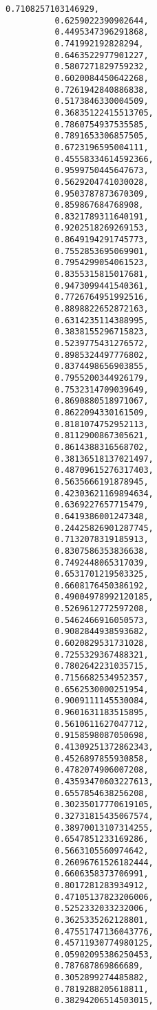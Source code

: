 \documentclass[11pt]{article}
\begin{document}
\begin{Verbatim}[commandchars=\\\{\}]
          0.7108257103146929,
          0.6259022390902644,
          0.4495347396291868,
          0.741992192828294,
          0.6463522977901227,
          0.5807271829759232,
          0.6020084450642268,
          0.7261942840886838,
          0.5173846330004509,
          0.36835122415513705,
          0.7860754937535585,
          0.7891653306857505,
          0.6723196595004111,
          0.45558334614592366,
          0.9599750445647673,
          0.5629204741030028,
          0.9503787873670309,
          0.859867684768908,
          0.8321789311640191,
          0.9202518269269153,
          0.8649194291745773,
          0.7552853695069901,
          0.7954299054061523,
          0.8355315815017681,
          0.9473099441540361,
          0.7726764951992516,
          0.8898822652872163,
          0.6314235114388995,
          0.3838155296715823,
          0.5239775431276572,
          0.8985324497776802,
          0.8374498656903855,
          0.7955200344926179,
          0.7532314709039649,
          0.8690880518971067,
          0.8622094330161509,
          0.8181074752952113,
          0.8112900867305621,
          0.8614388316568702,
          0.38136518137021497,
          0.48709615276317403,
          0.5635666191878945,
          0.42303621169894634,
          0.6369227657715479,
          0.6419386001247348,
          0.24425826901287745,
          0.7132078319185913,
          0.8307586353836638,
          0.7492448065317039,
          0.6531701219503325,
          0.6608176450386192,
          0.49004978992120185,
          0.5269612772597208,
          0.5462466916050573,
          0.9082844938593682,
          0.6020829531731028,
          0.7255329367488321,
          0.7802642231035715,
          0.7156682534952357,
          0.6562530000251954,
          0.9009111145530084,
          0.9601631183515895,
          0.5610611627047712,
          0.9158598087050698,
          0.41309251372862343,
          0.4526897855930858,
          0.4782074906007208,
          0.43593470603227613,
          0.6557854638256208,
          0.30235017770619105,
          0.32731815435067574,
          0.38970013107314255,
          0.6547851233169286,
          0.5663105560974642,
          0.26096761526182444,
          0.6606358373706991,
          0.8017281283934912,
          0.47105137823206006,
          0.5252332033232006,
          0.3625335262128801,
          0.47551747136043776,
          0.45711930774980125,
          0.05902095386250453,
          0.787687869866689,
          0.3052899274485882,
          0.7819288205618811,
          0.38294206514503015,

\end{Verbatim}
\end{document}
